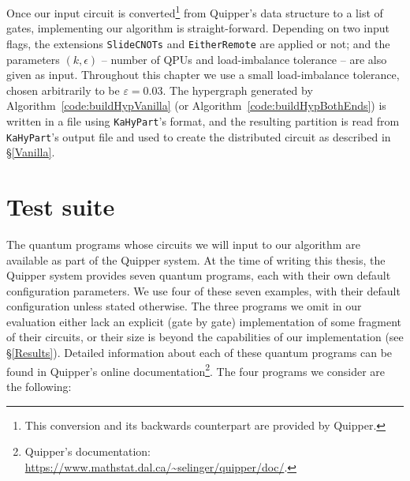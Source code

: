Once our input circuit is converted\footnote{This conversion and its backwards counterpart are provided by Quipper.} from Quipper's data structure to a list of gates, implementing our algorithm is straight-forward. Depending on two input flags, the extensions \texttt{SlideCNOTs} and \texttt{EitherRemote} are applied or not; and the parameters \((k,\epsilon)\) -- number of QPUs and load-imbalance tolerance -- are also given as input. Throughout this chapter we use a small load-imbalance tolerance, chosen arbitrarily to be \(\varepsilon = 0.03\). The hypergraph generated by Algorithm~\ref{code:buildHypVanilla} (or Algorithm~\ref{code:buildHypBothEnds}) is written in a file using \texttt{KaHyPart}'s format, and the resulting partition is read from \texttt{KaHyPart}'s output file and used to create the distributed circuit as described in \S\ref{Vanilla}.


\section{Test suite}
\label{benchmark}

The quantum programs whose circuits we will input to our algorithm are available as part of the Quipper system. At the time of writing this thesis, the Quipper system provides seven quantum programs, each with their own default configuration parameters. We use four of these seven examples, with their default configuration unless stated otherwise. The three programs we omit in our evaluation either lack an explicit (gate by gate) implementation of some fragment of their circuits, or their size is beyond the capabilities of our implementation (see \S\ref{Results}). Detailed information about each of these quantum programs can be found in Quipper's online documentation\footnote{Quipper's documentation: \url{https://www.mathstat.dal.ca/~selinger/quipper/doc/}.}. The four programs we consider are the following:

